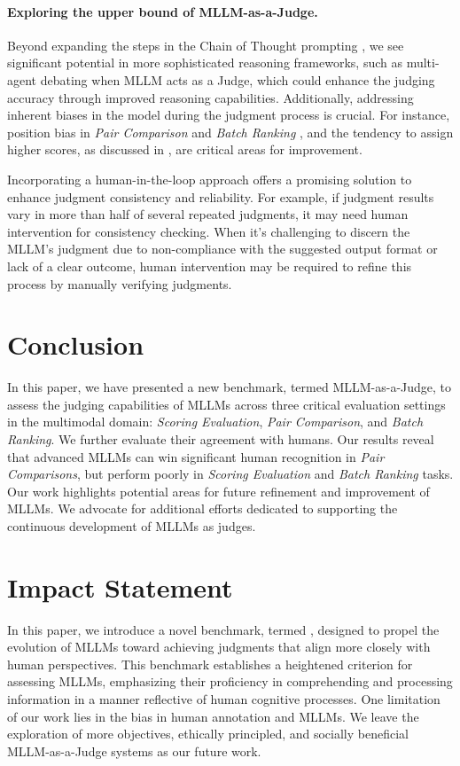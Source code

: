 \paragraph{Exploring the upper bound of MLLM-as-a-Judge.}
Beyond expanding the steps in the Chain of Thought prompting \citep{wei2022chain}, we see significant potential in more sophisticated reasoning frameworks, such as multi-agent debating \citep{chan2023chateval} when MLLM acts as a Judge, which could enhance the judging accuracy through improved reasoning capabilities. Additionally, addressing inherent biases in the model during the judgment process is crucial. For instance, position bias in \textit{Pair Comparison} and \textit{Batch Ranking} \citep{zheng2023large, wang2024my}, and the tendency to assign higher scores, as discussed in \citep{lee2024prometheus}, are critical areas for improvement.

Incorporating a human-in-the-loop approach \citep{wang2023large} offers a promising solution to enhance judgment consistency and reliability. For example, if judgment results vary in more than half of several repeated judgments, it may need human intervention for consistency checking. When it's challenging to discern the MLLM's judgment due to non-compliance with the suggested output format or lack of a clear outcome, human intervention may be required to refine this process by manually verifying judgments. 

\section{Conclusion}
In this paper, we have presented a new benchmark, termed {MLLM-as-a-Judge}, to assess the judging capabilities of MLLMs across three critical evaluation settings in the multimodal domain: \textit{Scoring Evaluation}, \textit{Pair Comparison}, and \textit{Batch Ranking}. We further evaluate their agreement with humans. Our results reveal that advanced MLLMs can win significant human recognition in \textit{Pair Comparisons}, but perform poorly in \textit{Scoring Evaluation} and \textit{Batch Ranking} tasks. Our work highlights potential areas for future refinement and improvement of MLLMs.
We advocate for additional efforts dedicated to supporting the continuous development of MLLMs as judges.

\section*{Impact Statement}
In this paper, we introduce a novel benchmark, termed , designed to propel the evolution of MLLMs toward achieving judgments that align more closely with human perspectives. This benchmark establishes a heightened criterion for assessing MLLMs, emphasizing their proficiency in comprehending and processing information in a manner reflective of human cognitive processes.  One limitation of our work lies in the bias in human annotation and MLLMs. We leave the exploration of more objectives, ethically principled, and socially beneficial MLLM-as-a-Judge systems as our future work.

\newpage

